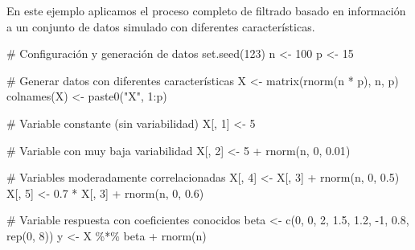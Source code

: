 \documentclass[
  letterpaper,
  DIV=11,
  numbers=noendperiod]{scrreprt}
\newenvironment{Shaded}{\begin{snugshade}}{\end{snugshade}}
\newcommand{\CommentTok}[1]{\textcolor[rgb]{0.37,0.37,0.37}{#1}}
\newcommand{\DecValTok}[1]{\textcolor[rgb]{0.68,0.00,0.00}{#1}}
\newcommand{\FloatTok}[1]{\textcolor[rgb]{0.68,0.00,0.00}{#1}}
\newcommand{\FunctionTok}[1]{\textcolor[rgb]{0.28,0.35,0.67}{#1}}
\newcommand{\NormalTok}[1]{\textcolor[rgb]{0.00,0.23,0.31}{#1}}
\newcommand{\OtherTok}[1]{\textcolor[rgb]{0.00,0.23,0.31}{#1}}
\newcommand{\SpecialCharTok}[1]{\textcolor[rgb]{0.37,0.37,0.37}{#1}}
\newcommand{\StringTok}[1]{\textcolor[rgb]{0.13,0.47,0.30}{#1}}
\begin{document}
\begin{tcolorbox}[enhanced jigsaw, breakable, toprule=.15mm, bottomtitle=1mm, coltitle=black, colbacktitle=quarto-callout-tip-color!10!white, titlerule=0mm, opacitybacktitle=0.6, bottomrule=.15mm, toptitle=1mm, title=\textcolor{quarto-callout-tip-color}{\faLightbulb}\hspace{0.5em}{Ejemplo de filtrado inicial}, arc=.35mm, rightrule=.15mm, opacityback=0, colframe=quarto-callout-tip-color-frame, leftrule=.75mm, left=2mm, colback=white]

En este ejemplo aplicamos el proceso completo de filtrado basado en
información a un conjunto de datos simulado con diferentes
características.

\begin{Shaded}
\begin{Highlighting}[]
\CommentTok{\# Configuración y generación de datos}
\FunctionTok{set.seed}\NormalTok{(}\DecValTok{123}\NormalTok{)}
\NormalTok{n }\OtherTok{\textless{}{-}} \DecValTok{100}
\NormalTok{p }\OtherTok{\textless{}{-}} \DecValTok{15}

\CommentTok{\# Generar datos con diferentes características}
\NormalTok{X }\OtherTok{\textless{}{-}} \FunctionTok{matrix}\NormalTok{(}\FunctionTok{rnorm}\NormalTok{(n }\SpecialCharTok{*}\NormalTok{ p), n, p)}
\FunctionTok{colnames}\NormalTok{(X) }\OtherTok{\textless{}{-}} \FunctionTok{paste0}\NormalTok{(}\StringTok{"X"}\NormalTok{, }\DecValTok{1}\SpecialCharTok{:}\NormalTok{p)}

\CommentTok{\# Variable constante (sin variabilidad)}
\NormalTok{X[, }\DecValTok{1}\NormalTok{] }\OtherTok{\textless{}{-}} \DecValTok{5}

\CommentTok{\# Variable con muy baja variabilidad  }
\NormalTok{X[, }\DecValTok{2}\NormalTok{] }\OtherTok{\textless{}{-}} \DecValTok{5} \SpecialCharTok{+} \FunctionTok{rnorm}\NormalTok{(n, }\DecValTok{0}\NormalTok{, }\FloatTok{0.01}\NormalTok{)}

\CommentTok{\# Variables moderadamente correlacionadas}
\NormalTok{X[, }\DecValTok{4}\NormalTok{] }\OtherTok{\textless{}{-}}\NormalTok{ X[, }\DecValTok{3}\NormalTok{] }\SpecialCharTok{+} \FunctionTok{rnorm}\NormalTok{(n, }\DecValTok{0}\NormalTok{, }\FloatTok{0.5}\NormalTok{)}
\NormalTok{X[, }\DecValTok{5}\NormalTok{] }\OtherTok{\textless{}{-}} \FloatTok{0.7} \SpecialCharTok{*}\NormalTok{ X[, }\DecValTok{3}\NormalTok{] }\SpecialCharTok{+} \FunctionTok{rnorm}\NormalTok{(n, }\DecValTok{0}\NormalTok{, }\FloatTok{0.6}\NormalTok{)}

\CommentTok{\# Variable respuesta con coeficientes conocidos}
\NormalTok{beta }\OtherTok{\textless{}{-}} \FunctionTok{c}\NormalTok{(}\DecValTok{0}\NormalTok{, }\DecValTok{0}\NormalTok{, }\DecValTok{2}\NormalTok{, }\FloatTok{1.5}\NormalTok{, }\FloatTok{1.2}\NormalTok{, }\SpecialCharTok{{-}}\DecValTok{1}\NormalTok{, }\FloatTok{0.8}\NormalTok{, }\FunctionTok{rep}\NormalTok{(}\DecValTok{0}\NormalTok{, }\DecValTok{8}\NormalTok{))}
\NormalTok{y }\OtherTok{\textless{}{-}}\NormalTok{ X }\SpecialCharTok{\%*\%}\NormalTok{ beta }\SpecialCharTok{+} \FunctionTok{rnorm}\NormalTok{(n)}


\end{Highlighting}
\end{Shaded}
\end{tcolorbox}
\end{document}
